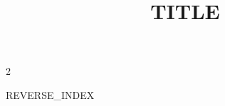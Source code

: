\documentclass[a4paper,10pt,twoside]{article}
\title{{\bkuwanalysisfont\color{bkuwaccent}\bfseries {{TITLE}}}}
\author{{\bkuwanalysisfont {{AUTHOR}}}}
\date{}
\begin{document}
\maketitle
\begin{multicols*}{2}

\end{multicols*}
{{REVERSE_INDEX}}
\end{document}
